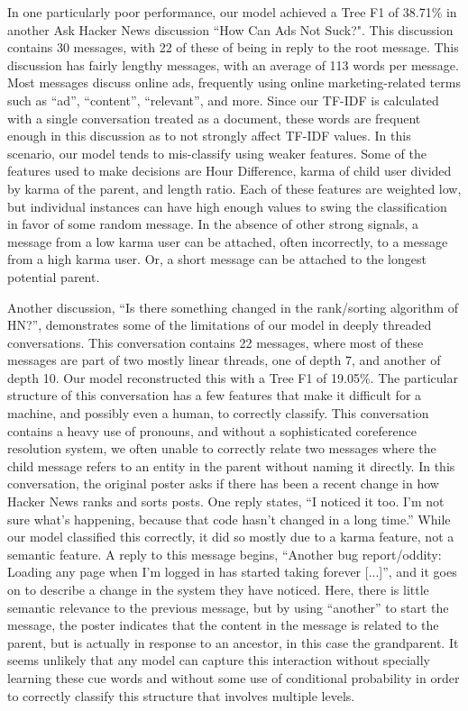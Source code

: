 \documentclass{article}
\begin{document}
In one particularly poor performance, our model achieved a Tree F1 of 38.71\% 
in another Ask Hacker News discussion ``How Can Ads Not Suck?". This 
discussion contains 30 messages, with 22 of these of being in reply to the 
root message. This discussion has fairly lengthy messages, with an average of 
113 words per message. Most messages discuss online ads, frequently using 
online marketing-related terms such as ``ad'', ``content'', ``relevant'', and 
more. Since our TF-IDF is calculated with a single conversation treated as a 
document, these words are frequent enough in this discussion as to not 
strongly affect TF-IDF values. In this scenario, our model tends to 
mis-classify using weaker features. Some of the features used to make decisions 
are Hour Difference, karma of child user divided by karma of the parent, and 
length ratio. Each of these features are weighted low, but individual 
instances can have high enough values to swing the classification in favor of 
some random message. In the absence of other strong signals, a message from a 
low karma user can be attached, often incorrectly, to a message from a high 
karma user. Or, a short message can be attached to the longest potential parent.

Another discussion, ``Is there something changed in the rank/sorting algorithm 
of HN?'', demonstrates some of the limitations of our model in deeply threaded 
conversations. This conversation contains 22 messages, where most of these 
messages are part of two mostly linear threads, one of depth 7, and another of 
depth 10. Our model reconstructed this with a Tree F1 of 19.05\%. The 
particular structure of this conversation has a few features that make it 
difficult for a machine, and possibly even a human, to correctly classify. 
This conversation contains a heavy use of pronouns, and without a 
sophisticated coreference resolution system, we often unable to correctly 
relate two messages where the child message refers to an entity in the parent 
without naming it directly. In this conversation, the original poster asks if 
there has been a recent change in how Hacker News ranks and sorts posts. One 
reply states, ``I noticed it too. I'm not sure what's happening, because that 
code hasn't changed in a long time.'' While our model classified this 
correctly, it did so mostly due to a karma feature, not a semantic feature. A 
reply to this message begins, ``Another bug report/oddity: Loading any page 
when I'm logged in has started taking forever [...]'', and it goes on to 
describe a change in the system they have noticed. Here, there is little 
semantic relevance to the previous message, but by using ``another'' to start 
the message, the poster indicates that the content in the message is related 
to the parent, but is actually in response to an ancestor, in this case the 
grandparent. It seems unlikely that any model can capture this interaction 
without specially learning these cue words and without some use of conditional 
probability in order to correctly classify this structure that involves 
multiple levels.
\end{document}

